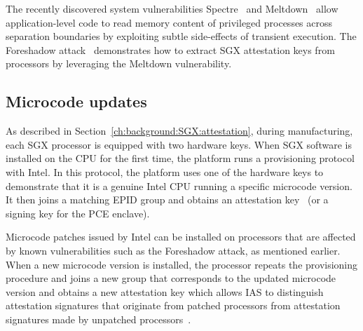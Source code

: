 The recently discovered system vulnerabilities Spectre~\cite{Kocher2018spectre} and Meltdown~\cite{Lipp2018meltdown} allow application-level code to read memory content of privileged processes across separation boundaries by exploiting subtle side-effects of transient execution. The Foreshadow attack~\cite{foreshadow-usenix18} demonstrates how to extract SGX attestation keys from processors by leveraging the Meltdown vulnerability. 

\subsection{Microcode updates}
As described in Section~\ref{ch:background:SGX:attestation}, during manufacturing, each SGX processor is equipped with two hardware keys. When SGX software is installed on the CPU for the first time, the platform runs a provisioning protocol with Intel. In this protocol, the platform uses one of the hardware keys to demonstrate that it is a genuine Intel CPU running a specific microcode version. It then joins a matching EPID group and obtains an attestation key~\cite{epid_attestation} (or a signing key for the PCE enclave). 

Microcode patches issued by Intel can be installed on processors that are affected by known vulnerabilities such as the Foreshadow attack, as mentioned earlier. When a new microcode version is installed, the processor repeats the provisioning procedure and joins a new group that corresponds to the updated microcode version and obtains a new attestation key which allows IAS to distinguish attestation signatures that originate from patched processors from attestation signatures made by unpatched processors~\cite{epid_attestation}.